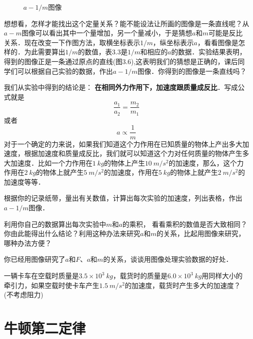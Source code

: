 \begin{Test}
\begin{figure}[H]
\begin{floatrow}
{
        }{\caption{$a-1/m$图像}}
    \end{floatrow}
\end{figure}
想想看，怎样才能找出这个定量关系？能不能设法让所画的图像是一条直线呢？从$a-m$图像可以看出其中一个量增加，另一个量减小，于是猜想$a$和$m$可能是反比关系．现在改变一下作图方法，取横坐标表示$1/m$，纵坐标表示$a$，看看图像是怎样的．为此需要算出$1/m$的数值，表3.3是$1/m$和相应的$a$的数据．实验结果表明，得到的图像正是一条通过原点的直线(图3.6),这表明我们的猜想是正确的，课后同学们可以根据自己实验的数据，作出$a-1/m$图像．你得到的图像是一条直线吗？


我们从实验中得到的结论是：\textbf{ 在相同外力作用下，加速度跟质量成反比}．写成公式就是
\[\frac{a_1}{a_2}=\frac{m_2}{m_1} \]
或者
\[a\propto \frac{1}{m} \]
对于一个确定的力来说，如果我们知道这个力作用在已知质量的物体上产出多大加速度，根据加速度和质量成反比，我们就可以知道这个力对任何质量的物体产生多大加速度．比如一个力作用在$\SI{1}{kg}$的物体上产生$\SI{10}{m/s^2}$的加速度，那么，这个力作用在$\SI{2}{kg}$的物体上就产生$\SI{5}{m/s^2}$的加速度，作用在$\SI{5}{kg}$的物体上就产生$\SI{2}{m/s^2}$的加速度等等．


\begin{Exercise}
	\begin{QsNum}
		\item 根据你的记录纸带，量出有关数值，计算出每次实验的加速度，列出表格，作出$a-1/m$图像．
		\item 利用你自己的数据算出每次实验中$m$和$a$的乘积，
		看看乘积的数值是否大致相同？你由此能得出什么结论？利用这种办法来研究$a$和$m$的关系，比起用图像来研究，哪种办法方便？
		\item 你已经用图像研究了$a$和$F$、$a$和$m$的关系，谈谈用图像处理实验数据的好处．
		\item 一辆卡车在空载时质量是$3.5\times 10^3~\si{kg}$，载货时的质量是$6.0\times 10^3~\si{kg}$用同样大小的牵引力，如果空载时使卡车产生$\SI{1.5}{m/s^2}$的加速度，载货时产生多大的加速度？(不考虑阻力)
	\end{QsNum}
\end{Exercise}




\section{牛顿第二定律}

\end{Test}

